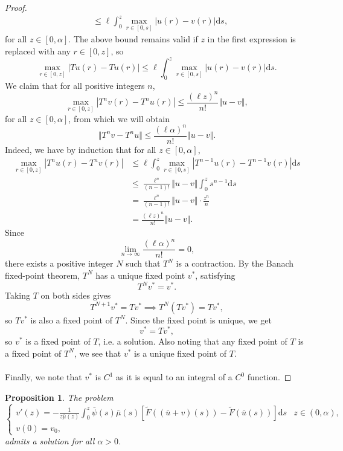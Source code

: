 \documentclass{article}
\newtheorem{prop}[thm]{Proposition}
\begin{document}
\begin{proof}
\begin{align*}
            &\leq \ell\int_0^z \max_{r\in[0,s]}|u(r) - v(r)|\mathrm{d}s,
        \end{align*}
        for all $z\in[0,\alpha]$. The above bound remains valid if $z$ in the first expression is replaced with any $r\in[0,z]$, so
        \[\max_{r\in[0,z]}|Tu(r) - Tu(r)|\leq \ell\int_0^z \max_{r\in[0,s]}|u(r) - v(r)|\mathrm{d}s.\]
        We claim that for all positive integers $n$,
        \[\max_{r\in[0,z]}|T^nv(r)-T^nu(r)| \leq \frac{(\ell z)^n}{n!}\Vert u-v\Vert,\]
        for all $z\in[0,\alpha]$, from which we will obtain
        \[\Vert T^nv - T^nu\Vert \leq \frac{(\ell \alpha)^n}{n!}\Vert u-v\Vert.\]
        Indeed, we have by induction that for all $z\in[0,\alpha]$,
        \begin{align*}
            \max_{r\in[0,z]}|T^nu(r) - T^nv(r)| &\leq \ell \int_0^z \max_{r\in[0,s]}|T^{n-1}u(r)-T^{n-1}v(r)|\mathrm{d}s \\
            &\leq \frac{\ell^n}{(n-1)!}\Vert u-v\Vert \int_0^zs^{n-1}\mathrm{d}s \\
            &= \frac{\ell^n}{(n-1)!}\Vert u-v\Vert\cdot \frac{z^n}n \\
            &= \frac{(\ell z)^n}{n!}\Vert u-v\Vert.
        \end{align*}
        Since
        \[\lim_{n\to\infty} \frac{(\ell \alpha)^n}{n!} = 0,\]
        there exists a positive integer $N$ such that $T^N$ is a contraction. By the Banach fixed-point theorem, $T^N$ has a unique fixed point $v^*$, satisfying
        \[T^Nv^* = v^*.\]
        Taking $T$ on both sides gives
        \[T^{N+1}v^* = Tv^*\implies T^N(Tv^*) = Tv^*,\]
        so $Tv^*$ is also a fixed point of $T^N$. Since the fixed point is unique, we get
        \[v^* = Tv^*,\]
        so $v^*$ is a fixed point of $T$, i.e. a solution. Also noting that any fixed point of $T$ is a fixed point of $T^N$, we see that $v^*$ is a unique fixed point of $T$. \\ \\
        Finally, we note that $v^*$ is $C^1$ as it is equal to an integral of a $C^0$ function.
    \end{proof}
    \begin{prop}
        The problem
        \[\begin{cases}v'(z) = -\frac 1{z\bar \mu(z)}\int_0^z \bar\psi(s)\bar\mu(s)[\widetilde F((\bar u+v)(s))-\widetilde F(\bar u(s))]\mathrm{d}s & z\in(0,\alpha), \\ v(0) = v_0, \end{cases}\]
        admits a solution for all $\alpha > 0$.
    \end{prop}
\end{document}
